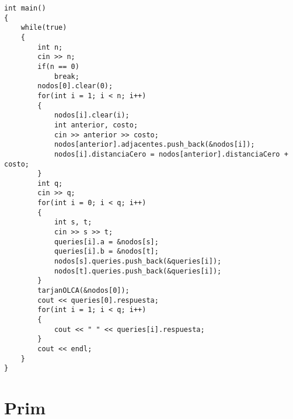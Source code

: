 \documentclass[a4paper, 11pt, oneside]{report}
\begin{document}
\begin{verbatim}
int main()
{
    while(true)
    {
        int n;
        cin >> n;
        if(n == 0)
            break;
        nodos[0].clear(0);
        for(int i = 1; i < n; i++)
        {
            nodos[i].clear(i);
            int anterior, costo;
            cin >> anterior >> costo;
            nodos[anterior].adjacentes.push_back(&nodos[i]);
            nodos[i].distanciaCero = nodos[anterior].distanciaCero + costo;
        }
        int q;
        cin >> q;
        for(int i = 0; i < q; i++)
        {
            int s, t;
            cin >> s >> t;
            queries[i].a = &nodos[s];
            queries[i].b = &nodos[t];
            nodos[s].queries.push_back(&queries[i]);
            nodos[t].queries.push_back(&queries[i]);
        }
        tarjanOLCA(&nodos[0]);
        cout << queries[0].respuesta;
        for(int i = 1; i < q; i++)
        {
            cout << " " << queries[i].respuesta;
        }
        cout << endl;
    }
}

\end{verbatim}

\section{Prim}
\end{document}
